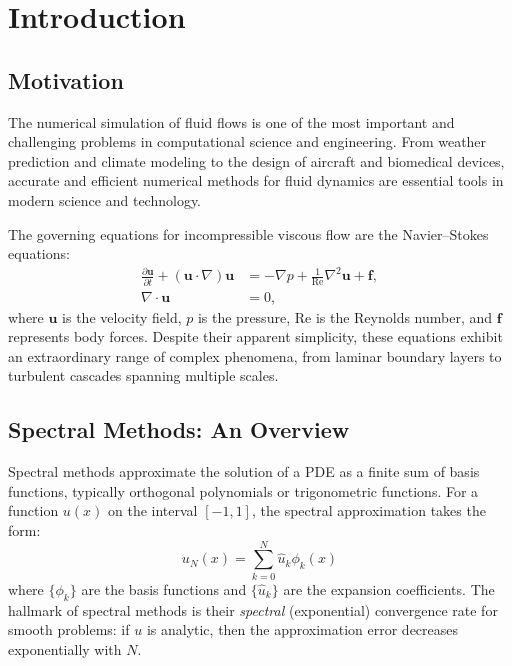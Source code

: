 \documentclass[12pt,a4paper,oneside]{report}
\begin{document}
\tableofcontents
\listoffigures
\listoftables


\chapter{Introduction}
\label{ch:introduction}

\section{Motivation}

The numerical simulation of fluid flows is one of the most important and challenging problems in computational science and engineering. From weather prediction and climate modeling to the design of aircraft and biomedical devices, accurate and efficient numerical methods for fluid dynamics are essential tools in modern science and technology.

The governing equations for incompressible viscous flow are the Navier--Stokes equations:
\begin{align}
  \frac{\partial \mathbf{u}}{\partial t} + (\mathbf{u} \cdot \nabla)\mathbf{u} &= -\nabla p + \frac{1}{\text{Re}} \nabla^2 \mathbf{u} + \mathbf{f}, \label{eq:ns_momentum} \\
  \nabla \cdot \mathbf{u} &= 0, \label{eq:ns_continuity}
\end{align}
where $\mathbf{u}$ is the velocity field, $p$ is the pressure, $\text{Re}$ is the Reynolds number, and $\mathbf{f}$ represents body forces. Despite their apparent simplicity, these equations exhibit an extraordinary range of complex phenomena, from laminar boundary layers to turbulent cascades spanning multiple scales.

\section{Spectral Methods: An Overview}

Spectral methods approximate the solution of a PDE as a finite sum of basis functions, typically orthogonal polynomials or trigonometric functions. For a function $u(x)$ on the interval $[-1, 1]$, the spectral approximation takes the form:
\begin{equation}
  u_N(x) = \sum_{k=0}^{N} \hat{u}_k \phi_k(x)
\end{equation}
where $\{\phi_k\}$ are the basis functions and $\{\hat{u}_k\}$ are the expansion coefficients. The hallmark of spectral methods is their \textit{spectral} (exponential) convergence rate for smooth problems: if $u$ is analytic, then the approximation error decreases exponentially with $N$.
\end{document}

